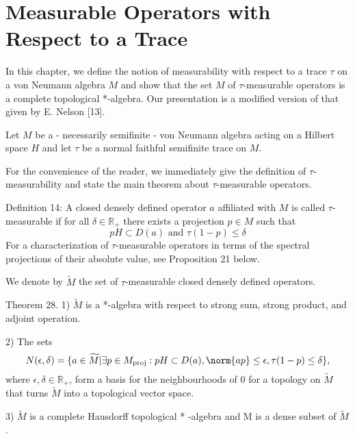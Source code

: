 
% 
\chapter{Measurable Operators with Respect to a Trace}
In this chapter, we define the notion of measurability with respect to a trace $\tau$ on a von Neumann algebra $M$ and show that the set $M$ of $\tau$-measurable operators is a complete topological *-algebra. Our presentation is a modified version of that given by E. Nelson [13].\par
Let $M$ be a - necessarily semifinite - von Neumann algebra acting on a Hilbert space $H$ and let $\tau$ be a normal faithful semifinite trace on $M$.\par
For the convenience of the reader, we immediately give the definition of $\tau$-measurability and state the main theorem about $\tau$-measurable operators.\par

Definition 14: A closed densely defined operator $a$ affiliated with $M$ is called $\tau$-measurable if for all $\delta\in \mathbb{R}_+$ there exists a projection $p\in M$ such that
\[
pH\subset D(a)\text{ and } \tau(1-p)\leq \delta
\]
For a characterization of $\tau$-measurable operators in terms of the spectral projections of their absolute value, see Proposition 21 below.\par
We denote by $\widetilde{M}$ the set of $\tau$-measurable closed densely defined operators.\par
Theorem 28. 1) $\widetilde{M}$ is a *-algebra with respect to strong sum, strong product, and adjoint operation.\par
2) The sets
\[
    N(\epsilon,\delta)=\{a\in \widetilde{M}|\exists p\in M_{\text{proj}}:pH\subset D(a),\norm{ap}\leq \epsilon,\tau(1-p)\leq \delta\},
\]
where $\epsilon,\delta\in \mathbb{R}_+$, form a basis for the neighbourhoods of $0$ for a topology on $\widetilde{M}$ that turns $\widetilde{M}$ into a topological vector space. \par
3) $\widetilde{M}$ is a complete Hausdorff topological * -algebra and M is a dense subset of $\widetilde{M}$.\par

